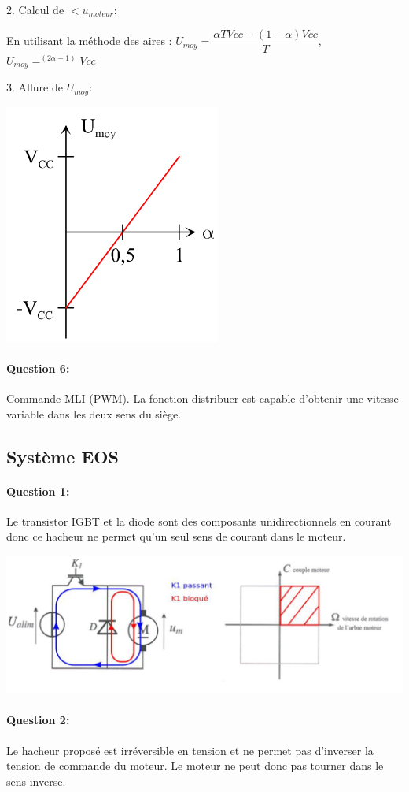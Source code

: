 2. Calcul de $<u_{moteur}$:

En utilisant la méthode des aires : $U_{moy}=\dfrac{\alpha T Vcc-(1-\alpha)Vcc}{T}$, $U_{moy}=^(2\alpha-1)Vcc$

3. Allure de $U_{moy}$:

\begin{center}
 \includegraphics[width=0.3\linewidth]{img/img05}
\end{center}

\paragraph{Question 6:} 
Commande MLI (PWM). La fonction \og distribuer \fg est capable d'obtenir une vitesse variable dans les deux sens du siège.

\subsection{Système EOS}

\paragraph{Question 1:}

Le transistor IGBT et la diode sont des composants unidirectionnels en courant donc ce hacheur ne permet qu'un seul sens de courant dans le moteur.

\begin{center}
 \includegraphics[width=0.3\linewidth]{img/td02_14}
\end{center}

\paragraph{Question 2:}

Le hacheur proposé est irréversible en tension et ne permet pas d'inverser la tension de
commande du moteur. Le moteur ne peut donc pas tourner dans le sens inverse.

